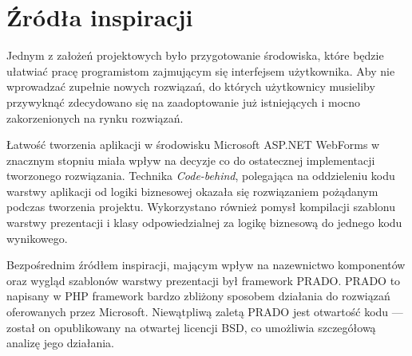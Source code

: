 \section{Źródła inspiracji}

Jednym z założeń projektowych było przygotowanie środowiska, które będzie ułatwiać pracę
programistom zajmującym się interfejsem użytkownika. Aby nie wprowadzać zupełnie nowych
rozwiązań, do których użytkownicy musieliby przywyknąć zdecydowano się na zaadoptowanie
już istniejących i mocno zakorzenionych na rynku rozwiązań.

Łatwość tworzenia aplikacji w środowisku Microsoft ASP.NET WebForms w znacznym stopniu miała
wpływ na decyzje co do ostatecznej implementacji tworzonego rozwiązania. Technika
\emph{Code-behind}, polegająca na oddzieleniu kodu warstwy aplikacji od logiki
biznesowej okazała się rozwiązaniem pożądanym podczas tworzenia projektu.
Wykorzystano również pomysł kompilacji szablonu warstwy prezentacji i klasy odpowiedzialnej
za logikę biznesową do jednego kodu wynikowego.

Bezpośrednim źródłem inspiracji, mającym wpływ na nazewnictwo komponentów oraz wygląd
szablonów warstwy prezentacji był framework PRADO. PRADO to napisany w PHP framework
bardzo zbliżony sposobem działania do rozwiązań oferowanych przez Microsoft. Niewątpliwą
zaletą PRADO jest otwartość kodu --- został on opublikowany na otwartej licencji BSD, co umożliwia
szczegółową analizę jego działania.